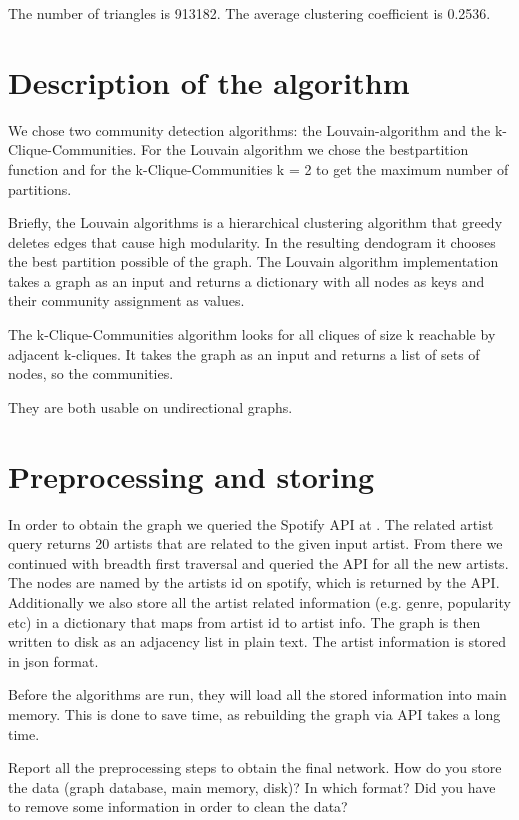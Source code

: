 \documentclass[11pt,a4paper,onecolumn,notitlepage]{article}
\begin{document}
The number of triangles is 913182. The average clustering coefficient is 0.2536.

\section{Description of the algorithm}

We chose two community detection algorithms: the Louvain-algorithm\cite{louvain} and the k-Clique-Communities\cite{kclique}. For the Louvain algorithm we chose the bestpartition function and for the k-Clique-Communities k = 2 to get the maximum number of partitions.

Briefly, the Louvain algorithms is a hierarchical clustering algorithm that greedy deletes edges that cause high modularity. In the resulting dendogram it chooses the best partition possible of the graph. The Louvain algorithm implementation takes a graph as an input and returns a dictionary with all nodes as keys and their community assignment as values. 

The k-Clique-Communities algorithm looks for all cliques of size k reachable by adjacent k-cliques. It takes the graph as an input and returns a list of sets of nodes, so the communities.

They are both usable on undirectional graphs.

\section{Preprocessing and storing}

In order to obtain the graph we queried the Spotify API at \cite{spotifyapi}. The related artist query returns 20 artists that are related to the given input artist.
From there we continued with breadth first traversal and queried the API for all the new artists.
The nodes are named by the artists id on spotify, which is returned by the API.
Additionally we also store all the artist related information (e.g. genre, popularity etc) in a dictionary that maps from artist id to artist info.
The graph is then written to disk as an adjacency list in plain text. The artist information is stored in json format.

Before the algorithms are run, they will load all the stored information into main memory. This is done to save time, as rebuilding the graph via API takes a long time.

Report all the preprocessing steps to obtain the final network. How do you store the data (graph database, main memory, disk)? In which format? Did you have to remove some information in order to clean the data? 
\end{document}
